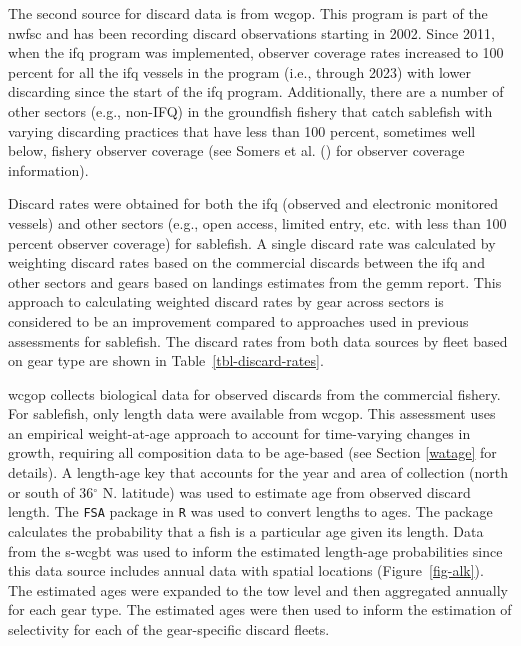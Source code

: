 \documentclass[
  english,
]{article}
\begin{document}
The second source for discard data is from \gls{wcgop}. This program is
part of the \gls{nwfsc} and has been recording discard observations
starting in 2002. Since 2011, when the \gls{ifq} program was
implemented, observer coverage rates increased to 100 percent for all
the \gls{ifq} vessels in the program (i.e., through 2023) with lower
discarding since the start of the \gls{ifq} program. Additionally, there
are a number of other sectors (e.g., non-IFQ) in the groundfish fishery
that catch sablefish with varying discarding practices that have less
than 100 percent, sometimes well below, fishery observer coverage (see
Somers et al. () for observer
coverage information).

Discard rates were obtained for both the \gls{ifq} (observed and
electronic monitored vessels) and other sectors (e.g., open access,
limited entry, etc. with less than 100 percent observer coverage) for
sablefish. A single discard rate was calculated by weighting discard
rates based on the commercial discards between the \gls{ifq} and other
sectors and gears based on landings estimates from the \gls{gemm}
report. This approach to calculating weighted discard rates by gear
across sectors is considered to be an improvement compared to approaches
used in previous assessments for sablefish. The discard rates from both
data sources by fleet based on gear type are shown in
Table~\ref{tbl-discard-rates}.

\gls{wcgop} collects biological data for observed discards from the
commercial fishery. For sablefish, only length data were available from
\gls{wcgop}. This assessment uses an empirical weight-at-age approach to
account for time-varying changes in growth, requiring all composition
data to be age-based (see Section \ref{watage} for details). A
length-age key that accounts for the year and area of collection (north
or south of 36\(^\circ\) N. latitude) was used to estimate age from
observed discard length. The \texttt{FSA} package in \texttt{R} was used
to convert lengths to ages. The package calculates the probability that
a fish is a particular age given its length. Data from the \gls{s-wcgbt}
was used to inform the estimated length-age probabilities since this
data source includes annual data with spatial locations
(Figure~\ref{fig-alk}). The estimated ages were expanded to the tow
level and then aggregated annually for each gear type. The estimated
ages were then used to inform the estimation of selectivity for each of
the gear-specific discard fleets.
\end{document}
